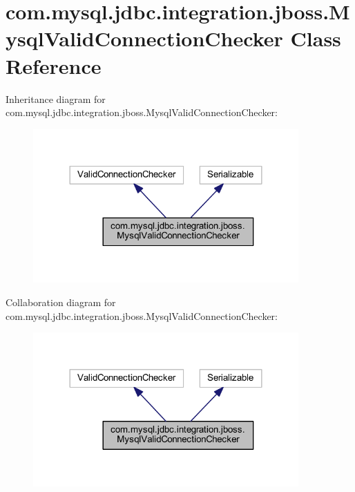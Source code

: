 \hypertarget{classcom_1_1mysql_1_1jdbc_1_1integration_1_1jboss_1_1_mysql_valid_connection_checker}{}\section{com.\+mysql.\+jdbc.\+integration.\+jboss.\+Mysql\+Valid\+Connection\+Checker Class Reference}
\label{classcom_1_1mysql_1_1jdbc_1_1integration_1_1jboss_1_1_mysql_valid_connection_checker}


Inheritance diagram for com.\+mysql.\+jdbc.\+integration.\+jboss.\+Mysql\+Valid\+Connection\+Checker\+:
\nopagebreak
\begin{figure}[H]
\begin{center}
\leavevmode
\includegraphics[width=288pt]{classcom_1_1mysql_1_1jdbc_1_1integration_1_1jboss_1_1_mysql_valid_connection_checker__inherit__graph}
\end{center}
\end{figure}


Collaboration diagram for com.\+mysql.\+jdbc.\+integration.\+jboss.\+Mysql\+Valid\+Connection\+Checker\+:
\nopagebreak
\begin{figure}[H]
\begin{center}
\leavevmode
\includegraphics[width=288pt]{classcom_1_1mysql_1_1jdbc_1_1integration_1_1jboss_1_1_mysql_valid_connection_checker__coll__graph}
\end{center}
\end{figure}
